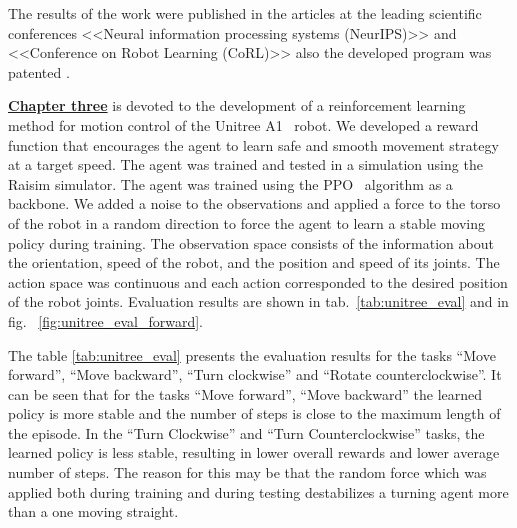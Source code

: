 The results of the work were published in the articles \cite{confbib1, confbib2} at the leading scientific conferences <<Neural information processing systems (NeurIPS)>> and <<Conference on Robot Learning (CoRL)>> also the developed program was patented \cite{progbib1}.

\underline{\textbf{Chapter three}} is devoted to the development of a reinforcement learning method for motion control of the Unitree A1~\cite{unitree} robot. We developed a reward function that encourages the agent to learn safe and smooth movement strategy at a target speed. The agent was trained and tested in a simulation using the Raisim \cite{raisim} simulator. The agent was trained using the PPO~\cite{Schulman2017ProximalPO} algorithm as a backbone. We added a noise to the observations and applied a force to the torso of the robot in a random direction to force the agent to learn a stable moving policy during training. The observation space consists of the information about the orientation, speed of the robot, and the position and speed of its joints. The action space was continuous and each action corresponded to the desired position of the robot joints. Evaluation results are shown in tab.~\ref{tab:unitree_eval} and in fig.~ \ref{fig:unitree_eval_forward}. 

The table \ref{tab:unitree_eval} presents the evaluation results for the tasks ``Move forward'', ``Move backward'', ``Turn clockwise'' and ``Rotate counterclockwise''. It can be seen that for the tasks ``Move forward'', ``Move backward'' the learned policy is more stable and the number of steps is close to the maximum length of the episode. In the ``Turn Clockwise'' and ``Turn Counterclockwise'' tasks, the learned policy is less stable, resulting in lower overall rewards and lower average number of steps. The reason for this may be that the random force which was applied both during training and during testing  destabilizes a turning agent more than a one moving straight.

